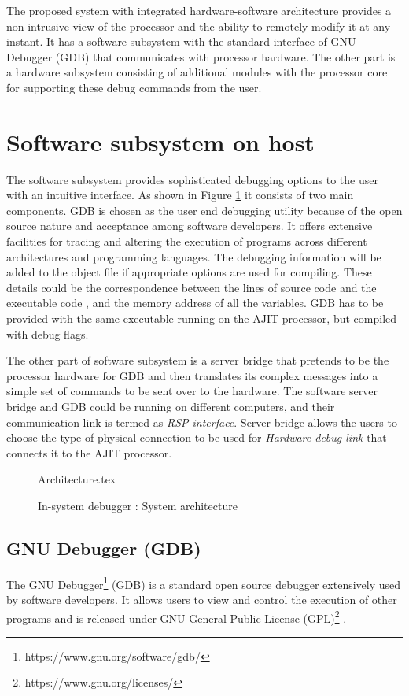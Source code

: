 
The proposed system with integrated hardware-software architecture provides a non-intrusive view of the processor and the ability to remotely modify it at any instant. It has a software subsystem with the standard interface of GNU Debugger (GDB)\cite{gdbManual} that communicates with processor hardware. The other part is a hardware subsystem consisting of additional modules with the processor core for supporting these debug commands from the user.

\section{Software subsystem on host}
The software subsystem provides sophisticated debugging options to the user with an intuitive interface. As shown in Figure \ref{SysArch} it consists of two main components. GDB is chosen as the user end debugging utility because of the open source nature and acceptance among software developers. It offers extensive facilities for tracing and altering the execution of programs across different architectures and programming languages. The debugging information will be added to the object file if appropriate options are used for compiling. These details could be the correspondence between the lines of source code and the executable code , and the memory address of all the variables. GDB has to be provided with the same executable running on the AJIT processor, but compiled with debug flags.

The other part of software subsystem is a server bridge that pretends to be the processor hardware for GDB and then translates its complex messages into a simple set of commands to be sent over to the hardware. The software server bridge and GDB could be running on different computers, and their communication link is termed as \textit{RSP interface}. Server bridge allows the users to choose the type of physical connection to be used for \textit{Hardware debug link} that connects it to the AJIT processor.

\begin{figure}[h!]
	\centering
	\def\svgwidth{0.7\columnwidth}
	{Architecture.tex}
	\caption{In-system debugger : System architecture}
	\label{SysArch}
\end{figure}

\subsection{GNU Debugger (GDB)}
The GNU Debugger\footnote{https://www.gnu.org/software/gdb/} (GDB) is a standard open source debugger extensively used by software developers. It allows users to view and control the execution of other programs and is released under GNU General Public License (GPL)\footnote{https://www.gnu.org/licenses/} .

